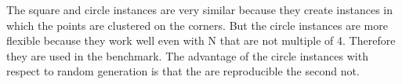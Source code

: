 The square and circle instances are very similar because they create instances in which the points are clustered on the corners.
But the circle instances are more flexible because they work well even with N that are not multiple of 4. Therefore they are used in the benchmark.
The advantage of the circle instances with respect to random generation is that the are reproducible the second not.